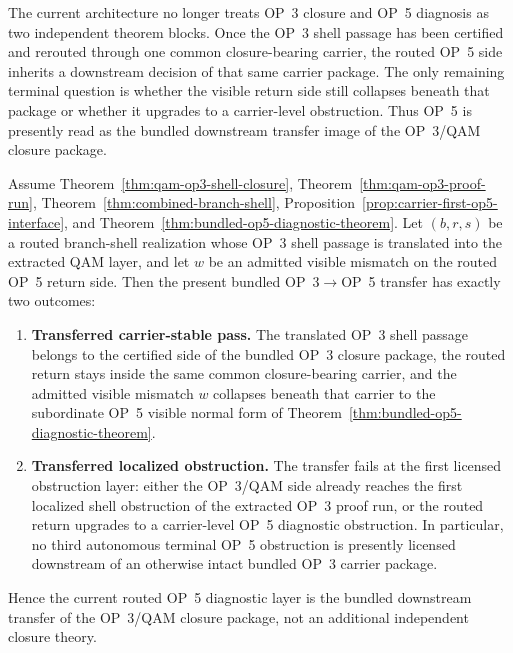\begin{remark}
The current architecture no longer treats OP~3 closure and OP~5 diagnosis as two independent theorem blocks. Once the OP~3 shell passage has been certified and rerouted through one common closure-bearing carrier, the routed OP~5 side inherits a downstream decision of that same carrier package. The only remaining terminal question is whether the visible return side still collapses beneath that package or whether it upgrades to a carrier-level obstruction. Thus OP~5 is presently read as the bundled downstream transfer image of the OP~3/QAM closure package.
\end{remark}

\begin{theorem}
\label{thm:first-op3-op5-bundled-transfer}
Assume Theorem~\ref{thm:qam-op3-shell-closure}, Theorem~\ref{thm:qam-op3-proof-run}, Theorem~\ref{thm:combined-branch-shell}, Proposition~\ref{prop:carrier-first-op5-interface}, and Theorem~\ref{thm:bundled-op5-diagnostic-theorem}. Let $(b,r,s)$ be a routed branch-shell realization whose OP~3 shell passage is translated into the extracted QAM layer, and let $w$ be an admitted visible mismatch on the routed OP~5 return side. Then the present bundled OP~3$\to$OP~5 transfer has exactly two outcomes:
\begin{enumerate}[leftmargin=2em,label=(\roman*)]
\item \textbf{Transferred carrier-stable pass.}
The translated OP~3 shell passage belongs to the certified side of the bundled OP~3 closure package, the routed return stays inside the same common closure-bearing carrier, and the admitted visible mismatch $w$ collapses beneath that carrier to the subordinate OP~5 visible normal form of Theorem~\ref{thm:bundled-op5-diagnostic-theorem}.
\item \textbf{Transferred localized obstruction.}
The transfer fails at the first licensed obstruction layer: either the OP~3/QAM side already reaches the first localized shell obstruction of the extracted OP~3 proof run, or the routed return upgrades to a carrier-level OP~5 diagnostic obstruction. In particular, no third autonomous terminal OP~5 obstruction is presently licensed downstream of an otherwise intact bundled OP~3 carrier package.
\end{enumerate}
Hence the current routed OP~5 diagnostic layer is the bundled downstream transfer of the OP~3/QAM closure package, not an additional independent closure theory.
\end{theorem}


